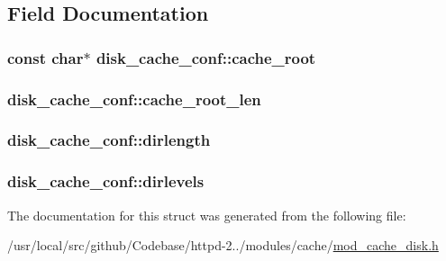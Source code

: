 \subsection{Field Documentation}
\subsubsection[{\texorpdfstring{cache\+\_\+root}{cache_root}}]{\setlength{\rightskip}{0pt plus 5cm}const char$\ast$ disk\+\_\+cache\+\_\+conf\+::cache\+\_\+root}\hypertarget{structdisk__cache__conf_aebfb44bf0fc50cdf40c6b32019fbfd4f}{}\label{structdisk__cache__conf_aebfb44bf0fc50cdf40c6b32019fbfd4f}
\subsubsection[{\texorpdfstring{cache\+\_\+root\+\_\+len}{cache_root_len}}]{ disk\+\_\+cache\+\_\+conf\+::cache\+\_\+root\+\_\+len}\hypertarget{structdisk__cache__conf_ae04bfadef2ae350f2bf507ca26f2573c}{}\label{structdisk__cache__conf_ae04bfadef2ae350f2bf507ca26f2573c}
\subsubsection[{\texorpdfstring{dirlength}{dirlength}}]{ disk\+\_\+cache\+\_\+conf\+::dirlength}\hypertarget{structdisk__cache__conf_a82027cd1934eedf82232babbf9c8e2f2}{}\label{structdisk__cache__conf_a82027cd1934eedf82232babbf9c8e2f2}
\subsubsection[{\texorpdfstring{dirlevels}{dirlevels}}]{ disk\+\_\+cache\+\_\+conf\+::dirlevels}\hypertarget{structdisk__cache__conf_a8b0138a8eea986bfc75a671f5f4c120e}{}\label{structdisk__cache__conf_a8b0138a8eea986bfc75a671f5f4c120e}


The documentation for this struct was generated from the following file\+:\begin{DoxyCompactItemize}
\item 
/usr/local/src/github/\+Codebase/httpd-\/2../modules/cache/\hyperlink{mod__cache__disk_8h}{mod\+\_\+cache\+\_\+disk.\+h}\end{DoxyCompactItemize}
